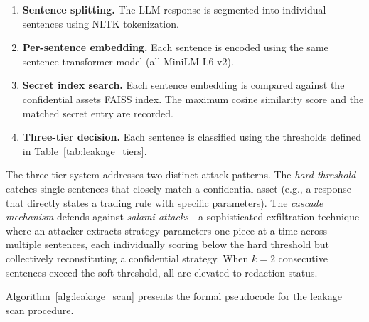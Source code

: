 \documentclass[journal]{IEEEtran}
\begin{document}
\begin{enumerate}
    \item \textbf{Sentence splitting.} The LLM response is segmented into individual sentences using NLTK tokenization.
    \item \textbf{Per-sentence embedding.} Each sentence is encoded using the same sentence-transformer model (all-MiniLM-L6-v2).
    \item \textbf{Secret index search.} Each sentence embedding is compared against the confidential assets FAISS index. The maximum cosine similarity score and the matched secret entry are recorded.
    \item \textbf{Three-tier decision.} Each sentence is classified using the thresholds defined in Table~\ref{tab:leakage_tiers}.
\end{enumerate}

\begin{table}[!ht]
    \centering
    \caption{Leakage Scan: Three-Tier Threshold System}
    \label{tab:leakage_tiers}
\end{table}

The three-tier system addresses two distinct attack patterns. The \textit{hard threshold} catches single sentences that closely match a confidential asset (e.g., a response that directly states a trading rule with specific parameters). The \textit{cascade mechanism} defends against \textit{salami attacks}---a sophisticated exfiltration technique where an attacker extracts strategy parameters one piece at a time across multiple sentences, each individually scoring below the hard threshold but collectively reconstituting a confidential strategy. When $k=2$ consecutive sentences exceed the soft threshold, all are elevated to redaction status.

Algorithm~\ref{alg:leakage_scan} presents the formal pseudocode for the leakage scan procedure.
\end{document}
